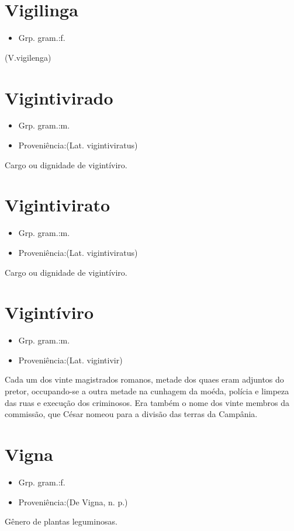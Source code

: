 \documentclass{article}
\begin{document}
\section{Vigilinga}
\begin{itemize}
\item {Grp. gram.:f.}
\end{itemize}
(V.vigilenga)
\section{Vigintivirado}
\begin{itemize}
\item {Grp. gram.:m.}
\end{itemize}
\begin{itemize}
\item {Proveniência:(Lat. \textunderscore vigintiviratus\textunderscore )}
\end{itemize}
Cargo ou dignidade de vigintíviro.
\section{Vigintivirato}
\begin{itemize}
\item {Grp. gram.:m.}
\end{itemize}
\begin{itemize}
\item {Proveniência:(Lat. \textunderscore vigintiviratus\textunderscore )}
\end{itemize}
Cargo ou dignidade de vigintíviro.
\section{Vigintíviro}
\begin{itemize}
\item {Grp. gram.:m.}
\end{itemize}
\begin{itemize}
\item {Proveniência:(Lat. \textunderscore vigintivir\textunderscore )}
\end{itemize}
Cada um dos vinte magistrados romanos, metade dos quaes eram adjuntos do pretor, occupando-se a outra metade na cunhagem da moéda, polícia e limpeza das ruas e execução dos criminosos.
Era também o nome dos vinte membros da commissão, que César nomeou para a divisão das terras da Campânia.
\section{Vigna}
\begin{itemize}
\item {Grp. gram.:f.}
\end{itemize}
\begin{itemize}
\item {Proveniência:(De \textunderscore Vigna\textunderscore , n. p.)}
\end{itemize}
Gênero de plantas leguminosas.
\end{document}
